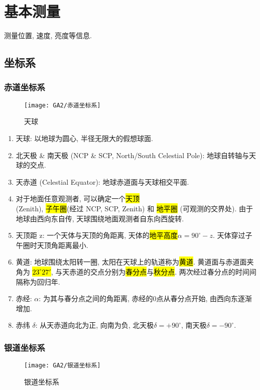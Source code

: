 \newpage

\section{基本测量}
测量位置, 速度, 亮度等信息.

\subsection{坐标系}

\subsubsection{赤道坐标系}
\begin{figure}[!htb]
    \centering
    \texttt{[image: GA2/赤道坐标系]}
    \caption{天球}
\end{figure}
\begin{enumerate}
    \item 天球: 以地球为圆心, 半径无限大的假想球面. 
    \item 北天极 \& 南天极 (NCP \& SCP, North/South Celestial Pole): 地球自转轴与天球的交点. 
    \item 天赤道 (Celestial Equator): 地球赤道面与天球相交平面. 
    \item 对于地面任意观测者, 可以确定一个\hl{天顶} \\(Zenith), \hl{子午圈}(经过 NCP, SCP, Zenith) 和 \hl{地平圈} (可观测的交界处). 由于地球由西向东自传, 天球围绕地面观测者自东向西旋转. 
    \item 天顶距 z: 一个天体与天顶的角距离, 天体的\hl{地平高度}$\alpha=90^{\circ}-z$. 天体穿过子午圈时天顶角距离最小. 
    \item 黄道: 地球围绕太阳转一圈, 太阳在天球上的轨道称为\hl{黄道}. 黄道面与赤道面夹角为 \hl{$23^{\circ}27'$}, 与天赤道的交点分别为\hl{春分点}与\hl{秋分点}. 两次经过春分点的时间间隔称为回归年. 
    \item 赤经: $\alpha$: 为其与春分点之间的角距离, 赤经的0点从春分点开始, 由西向东逐渐增加. 
    \item 赤纬 $\delta$: 从天赤道向北为正, 向南为负, 北天极$\delta=+90^{\circ}$, 南天极$\delta=-90^{\circ}$. 
\end{enumerate}

\subsubsection{银道坐标系}
\begin{figure}[!htb]
    \centering
    \texttt{[image: GA2/银道坐标系]}
    \caption{银道坐标系}
\end{figure}

